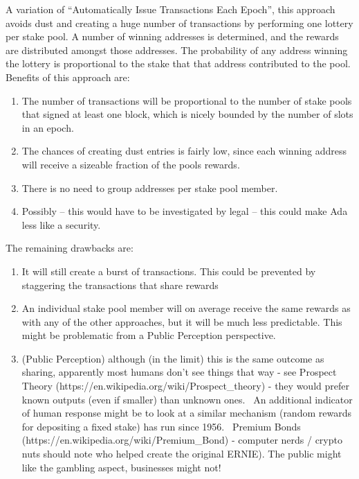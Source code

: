 \documentclass[11pt,a4paper]{article}
\begin{document}
A variation of ``Automatically Issue Transactions Each Epoch'', this
approach avoids dust and creating a huge number of transactions by
performing one lottery per stake pool. A number of winning addresses is
determined, and the rewards are distributed amongst those addresses. The
probability of any address winning the lottery is proportional to the
stake that that address contributed to the pool. Benefits of this
approach are:

\begin{enumerate}
\item
  The number of transactions will be proportional to the number of stake
  pools that signed at least one block, which is nicely bounded by the
  number of slots in an epoch.
\item
  The chances of creating dust entries is fairly low, since each winning
  address will receive a sizeable fraction of the pools rewards.
\item
  There is no need to group addresses per stake pool member.
\item
  Possibly -- this would have to be investigated by legal -- this could
  make Ada less like a security.
\end{enumerate}

The remaining drawbacks are:

\begin{enumerate}
\item
  It will still create a burst of transactions. This could be prevented
  by staggering the transactions that share rewards
\item
  An individual stake pool member will on average receive the same
  rewards as with any of the other approaches, but it will be much less
  predictable. This might be problematic from a Public Perception
  perspective.
\item
  (Public Perception) although (in the limit) this is the same outcome
  as sharing, apparently most humans don't see things that way - see
  Prospect Theory (https://en.wikipedia.org/wiki/Prospect\_theory) -
  they would prefer known outputs (even if smaller) than unknown ones.
  ~An additional indicator of human response might be to look at a
  similar mechanism (random rewards for depositing a fixed stake) has
  run since 1956. ~Premium Bonds
  (https://en.wikipedia.org/wiki/Premium\_Bond) - computer nerds /
  crypto nuts should note who helped create the original ERNIE). The
  public might like the gambling aspect, businesses might not!
\end{enumerate}
\end{document}
